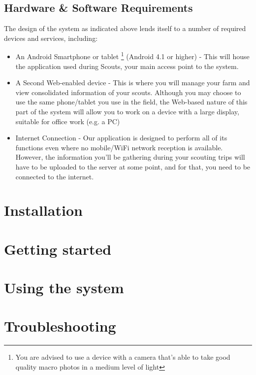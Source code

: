 \documentclass[11pt,a4paper,titlepage]{article}
\begin{document}
\subsection{Hardware \& Software Requirements}
The design of the system as indicated above lends itself to a number of required devices and services, including:
	\begin{itemize}
		\item An Android Smartphone or tablet \footnote{You are advised to use a device with a camera that's able to take good quality macro photos in a medium level of light} (Android 4.1 or higher) - This will house the application used during Scouts, your main access point to the system.
		\item A Second Web-enabled device - This is where you will manage your farm and view consolidated information of your scouts. Although you may choose to use the same phone/tablet you use in the field, the Web-based nature of this part of the system will allow you to work on a device with a large display, suitable for office work (e.g. a PC)
		\item Internet Connection - Our application is designed to perform all of its functions even where no mobile/WiFi network reception is available. However, the information you'll be gathering during your scouting trips will have to be uploaded to the server at some point, and for that, you need to be connected to the internet. 
	\end{itemize}



\section{Installation}
		
\section{Getting started}

\section{Using the system}

\section{Troubleshooting}
\end{document}

